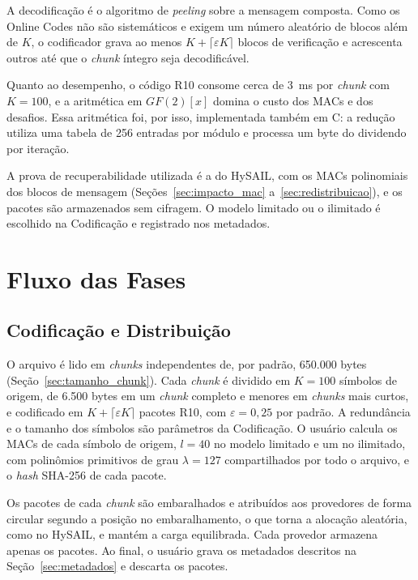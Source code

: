 A decodificação é o algoritmo de \emph{peeling} sobre a mensagem composta. Como os Online Codes não são sistemáticos e exigem um número aleatório de blocos além de $K$, o codificador grava ao menos $K + \lceil \varepsilon K \rceil$ blocos de verificação e acrescenta outros até que o \emph{chunk} íntegro seja decodificável.

Quanto ao desempenho, o código R10 consome cerca de 3~ms por \emph{chunk} com $K = 100$, e a aritmética em $GF(2)[x]$ domina o custo dos \acrshort{MAC}s e dos desafios. Essa aritmética foi, por isso, implementada também em C: a redução utiliza uma tabela de 256 entradas por módulo e processa um byte do dividendo por iteração.

A prova de recuperabilidade utilizada é a do HySAIL, com os \acrshort{MAC}s polinomiais dos blocos de mensagem (Seções~\ref{sec:impacto_mac} a~\ref{sec:redistribuicao}), e os pacotes são armazenados sem cifragem. O modelo limitado ou o ilimitado é escolhido na Codificação e registrado nos metadados.

\section{Fluxo das Fases}

\subsection{Codificação e Distribuição}
O arquivo é lido em \emph{chunks} independentes de, por padrão, 650.000 bytes (Seção~\ref{sec:tamanho_chunk}). Cada \emph{chunk} é dividido em $K = 100$ símbolos de origem, de 6.500 bytes em um \emph{chunk} completo e menores em \emph{chunks} mais curtos, e codificado em $K + \lceil \varepsilon K \rceil$ pacotes R10, com $\varepsilon = 0{,}25$ por padrão. A redundância e o tamanho dos símbolos são parâmetros da Codificação. O usuário calcula os \acrshort{MAC}s de cada símbolo de origem, $l = 40$ no modelo limitado e um no ilimitado, com polinômios primitivos de grau $\lambda = 127$ compartilhados por todo o arquivo, e o \emph{hash} SHA-256 de cada pacote.

Os pacotes de cada \emph{chunk} são embaralhados e atribuídos aos provedores de forma circular segundo a posição no embaralhamento, o que torna a alocação aleatória, como no HySAIL, e mantém a carga equilibrada. Cada provedor armazena apenas os pacotes. Ao final, o usuário grava os metadados descritos na Seção~\ref{sec:metadados} e descarta os pacotes.

